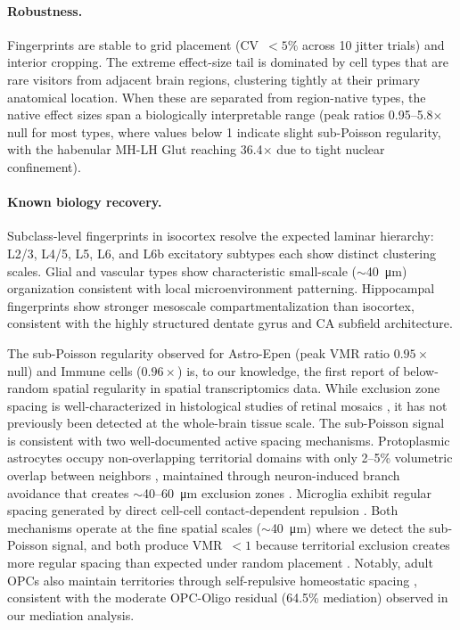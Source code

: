 \documentclass[11pt,a4paper]{article}
\begin{document}
\paragraph{Robustness.}
Fingerprints are stable to grid placement (CV~$< 5\%$ across 10 jitter trials)
and interior cropping. The extreme effect-size tail is dominated by cell types
that are rare visitors from adjacent brain regions, clustering tightly at their
primary anatomical location. When these are separated from region-native types,
the native effect sizes span a biologically interpretable range
(peak ratios 0.95--5.8$\times$ null for most types, where values below 1
indicate slight sub-Poisson regularity, with the habenular MH-LH Glut
reaching 36.4$\times$ due to tight nuclear confinement).

\paragraph{Known biology recovery.}
Subclass-level fingerprints in isocortex resolve the expected laminar hierarchy:
L2/3, L4/5, L5, L6, and L6b excitatory subtypes each show distinct clustering
scales. Glial and vascular types show characteristic small-scale
($\sim$\SI{40}{\micro\meter}) organization consistent with local microenvironment
patterning. Hippocampal fingerprints show stronger mesoscale compartmentalization
than isocortex, consistent with the highly structured dentate gyrus and CA
subfield architecture.

The sub-Poisson regularity observed for Astro-Epen (peak VMR ratio $0.95\times$
null) and Immune cells ($0.96\times$) is, to our knowledge, the first report of
below-random spatial regularity in spatial transcriptomics data. While
exclusion zone spacing is well-characterized in histological studies of retinal
mosaics \citep{Keeley2020}, it has not previously been detected at the
whole-brain tissue scale. The sub-Poisson signal is consistent with two
well-documented active spacing mechanisms. Protoplasmic astrocytes occupy non-overlapping
territorial domains with only 2--5\% volumetric overlap between neighbors
\citep{Bushong2002}, maintained through neuron-induced branch avoidance that
creates $\sim$40--60~\si{\micro\meter} exclusion zones
\citep{Hayashi2022, Halassa2007, Lanjakornsiripan2018}. Microglia exhibit
regular spacing generated by direct cell-cell contact-dependent repulsion
\citep{Endo2021, Davis2017}. Both mechanisms operate at the fine spatial scales
($\sim$40~\si{\micro\meter}) where we detect the sub-Poisson signal, and both
produce VMR~$< 1$ because territorial exclusion creates more regular spacing
than expected under random placement \citep{Keeley2020}. Notably, adult OPCs
also maintain territories through self-repulsive homeostatic spacing
\citep{Hughes2013}, consistent with the moderate OPC-Oligo residual (64.5\%
mediation) observed in our mediation analysis.
\end{document}
